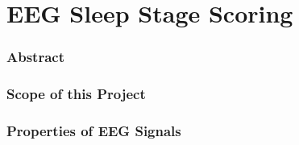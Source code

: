 \part{EEG Sleep Stage Scoring}

\section{Abstract}

\section{Scope of this Project}

\section{Properties of EEG Signals}

